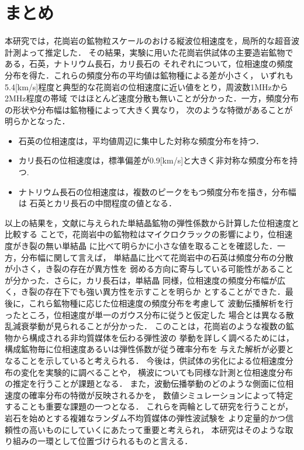 \documentclass{jsce}
\begin{document}
\section{まとめ}
本研究では，花崗岩の鉱物粒スケールのおける縦波位相速度を，局所的な超音波計測よって推定した．
その結果，実験に用いた花崗岩供試体の主要造岩鉱物である，石英，ナトリウム長石，カリ長石の
それぞれについて，位相速度の頻度分布を得た．これらの頻度分布の平均値は鉱物種による差が小さく，
いずれも5.4[km/s]程度と典型的な花崗岩の位相速度に近い値をとり，周波数1MHzから2MHz程度の帯域
ではほとんど速度分散も無いことが分かった．一方，頻度分布の形状や分布幅は鉱物種によって大きく異なり，
次のような特徴があることが明らかとなった．
\begin{itemize}
\item
石英の位相速度は，平均値周辺に集中した対称な頻度分布を持つ．
\item
カリ長石の位相速度は，標準偏差が0.9[km/s]と大きく非対称な頻度分布を持つ. 
\item
ナトリウム長石の位相速度は，複数のピークをもつ頻度分布を描き，分布幅は
石英とカリ長石の中間程度の値となる．
\end{itemize}
以上の結果を，文献に与えられた単結晶鉱物の弾性係数から計算した位相速度と比較する
ことで，花崗岩中の鉱物粒はマイクロクラックの影響により，位相速度がき裂の無い単結晶
に比べて明らかに小さな値を取ることを確認した．一方，分布幅に関して言えば，
単結晶に比べて花崗岩中の石英は頻度分布の分散が小さく，き裂の存在が異方性を
弱める方向に寄与している可能性があることが分かった．さらに，カリ長石は，単結晶
同様，位相速度の頻度分布幅が広く，き裂の存在下でも強い異方性を示すことを明らか
とすることができた．最後に，これら鉱物種に応じた位相速度の頻度分布を考慮して
波動伝播解析を行ったところ，位相速度が単一のガウス分布に従うと仮定した
場合とは異なる散乱減衰挙動が見られることが分かった．
このことは，花崗岩のような複数の鉱物から構成される非均質媒体を伝わる弾性波の
挙動を詳しく調べるためには，構成鉱物毎に位相速度あるいは弾性係数が従う確率分布を
与えた解析が必要となることを示していると考えられる．
今後は，供試体の劣化による位相速度分布の変化を実験的に調べることや，
横波についても同様な計測と位相速度分布の推定を行うことが課題となる．
また，波動伝播挙動のどのような側面に位相速度の確率分布の特徴が反映されるかを，
数値シミュレーションによって特定することも重要な課題の一つとなる．
これらを両輪として研究を行うことが，岩石を始めとする複雑なランダム不均質媒体の弾性波試験を
より定量的かつ信頼性の高いものにしていくにあたって重要と考えられ，
本研究はそのような取り組みの一環として位置づけられるものと言える．
\\
\end{document}
